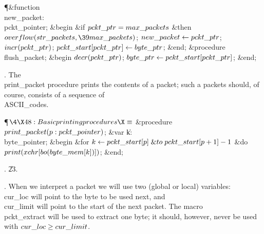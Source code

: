 \Y\P\4\&{function}\1\  \\{new\_packet}: \\{pckt\_pointer};\2\6
\&{begin} \&{if} $\\{pckt\_ptr}=\\{max\_packets}$ \1\&{then}\5
$\\{overflow}(\\{str\_packets},\39\\{max\_packets})$;\2\6
$\\{new\_packet}\K\\{pckt\_ptr}$;\5
$\\{incr}(\\{pckt\_ptr})$;\5
$\\{pckt\_start}[\\{pckt\_ptr}]\K\\{byte\_ptr}$;\6
\&{end};\7
\4\&{procedure}\1\  \\{flush\_packet};\2\6
\&{begin} $\\{decr}(\\{pckt\_ptr})$;\5
$\\{byte\_ptr}\K\\{pckt\_start}[\\{pckt\_ptr}]$;\6
\&{end};\par
\fi

. The \\{print\_packet} procedure prints the contents of a packet; such a
packets should, of course, consists of a sequence of \\{ASCII\_code}s.

\Y\P$\4\X48:Basic printing procedures\X\S$\6
\4\&{procedure}\1\  $\\{print\_packet}(\|p:\\{pckt\_pointer})$;\6
\4\&{var} \|k: \\{byte\_pointer};\2\6
\&{begin} \&{for} $\|k\K\\{pckt\_start}[\|p]\mathrel{\&{to}}\\{pckt\_start}[%
\|p+1]-1$ \1\&{do}\5
$\\{print}(\\{xchr}[\\{bo}(\\{byte\_mem}[\|k])])$;\2\6
\&{end};\par
{}.
\U23.\fi

. When we interpret a packet we will use two (global or local) variables:
\\{cur\_loc} will point to the byte to be used next, and \\{cur\_limit} will
point to the start of the next packet. The macro \\{pckt\_extract} will be
used to extract one byte; it should, however, never be used with
$\\{cur\_loc}\G\\{cur\_limit}$.


